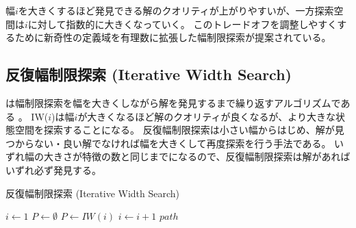 幅$i$を大きくするほど発見できる解のクオリティが上がりやすいが、一方探索空間は$i$に対して指数的に大きくなっていく。
このトレードオフを調整しやすくするために新奇性の定義域を有理数に拡張した幅制限探索が提案されている\cite{geffner2015}。


\subsection{反復幅制限探索 (Iterative Width Search)}
\label{sec:iterative-width-search}

は幅制限探索を幅を大きくしながら解を発見するまで繰り返すアルゴリズムである \cite{lipovetzkyg12}。
IW($i$)は幅$i$が大きくなるほど解のクオリティが良くなるが、より大きな状態空間を探索することになる。
反復幅制限探索は小さい幅からはじめ、解が見つからない・良い解でなければ幅を大きくして再度探索を行う手法である。
いずれ幅の大きさが特徴の数と同じまでになるので、反復幅制限探索は解があればいずれ必ず発見する。

\begin{algorithm}
\caption{反復幅制限探索 (Iterative Width Search)}
$i \leftarrow 1$\;
$P \leftarrow \emptyset$\;
	 {
		$P \leftarrow IW(i)$\;
		$i \leftarrow i + 1$\;
	}
	\Return $path$
\end{algorithm}

\begin{comment}

\subsection{Best-First Width Search (最良優先幅制限探索)}
\label{sec:width-based-heuristic-search}

\cite{geffner2015}


\subsection{Novelty Heuristics (新奇性に基づくヒューリスティック)}
\label{sec:novelty-heuristics}

ここまでの議論では新奇性を枝刈りのために使った。
しかしノードを捨ててしまう枝刈りは解が存在する問題でも解を発見できなくなってしまうという問題がある。
新奇性を使ってノードを完全に捨ててしまうのではなく、新奇性に基づいてノードを展開する優先度を決めるというアプローチをとることができる \cite{geffner2015}。つまり新奇性をヒューリスティックに使うということである。
この方法ではノードは完全に捨てられることはないので解を捨ててしまう可能性はなくなる。

ここで注意しなければならないのは新奇性は生成済みノード集合に依存する値である。
つまり新奇性に基づくヒューリスティック関数は状態$s$の関数ではなく、状態とクローズドリストの関数となる。つまり、同じ状態のノードでもヒューリスティック値が異なる場合がある。

\end{comment}

